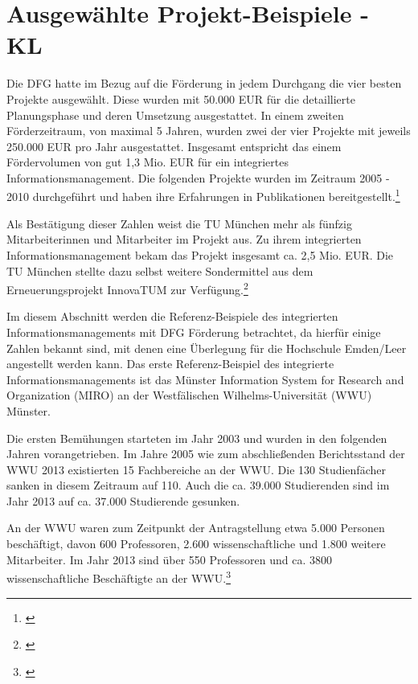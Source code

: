 
\section{Ausgewählte Projekt-Beispiele - KL}

\label{section_projekt_beispiele}
Die DFG hatte im Bezug auf die Förderung in jedem Durchgang die vier besten Projekte ausgewählt.
Diese wurden mit 50.000 EUR für die detaillierte Planungsphase und deren Umsetzung ausgestattet.
In einem zweiten Förderzeitraum, von maximal 5 Jahren, wurden zwei der vier Projekte mit jeweils 250.000 EUR pro Jahr ausgestattet.
Insgesamt entspricht das einem Fördervolumen von gut 1,3 Mio. EUR für ein integriertes Informationsmanagement.
Die folgenden Projekte wurden im Zeitraum 2005 - 2010 durchgeführt und haben ihre Erfahrungen in Publikationen bereitgestellt.\footnote{\cite{kerres_hochschulen_2005}}

Als Bestätigung dieser Zahlen weist die TU München mehr als fünfzig Mitarbeiterinnen und Mitarbeiter im Projekt aus. Zu ihrem integrierten Informationsmanagement bekam das Projekt insgesamt ca. 2,5 Mio. EUR. Die TU München stellte dazu selbst weitere Sondermittel aus dem Erneuerungsprojekt InnovaTUM zur Verfügung.\footnote{\cite{bode_informationsmanagement_2010}}

Im diesem Abschnitt werden die Referenz-Beispiele des integrierten Informationsmanagements mit DFG Förderung betrachtet, da hierfür einige Zahlen bekannt sind, mit denen eine
Überlegung für die Hochschule Emden/Leer angestellt werden kann. Das erste Referenz-Beispiel des integrierte Informationsmanagements ist das Münster Information System for Research and Organization (MIRO) an der Westfälischen Wilhelms-Universität (WWU) Münster.

Die ersten Bemühungen starteten im Jahr 2003 und wurden in den folgenden Jahren vorangetrieben. Im Jahre 2005 wie zum abschließenden Berichtsstand der WWU 2013 existierten 15 Fachbereiche an der WWU. Die 130 Studienfächer sanken in diesem Zeitraum auf 110. Auch die ca. 39.000 Studierenden sind im Jahr 2013 auf ca. 37.000 Studierende gesunken.

\clearpage

An der WWU waren zum Zeitpunkt der Antragstellung etwa 5.000 Personen beschäftigt, davon 600 Professoren, 2.600 wissenschaftliche und 1.800 weitere Mitarbeiter. Im Jahr 2013 sind über 550 Professoren und ca. 3800 wissenschaftliche Beschäftigte an der WWU.\footnote{\cite{vogl_bericht_2013}}

